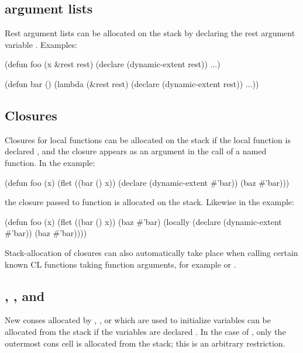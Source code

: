\subsection{ argument lists}

Rest argument lists can be allocated on the stack by declaring the
rest argument variable .  Examples:

\begin{lisp}
(defun foo (x &rest rest)
  (declare (dynamic-extent rest))
  ...)

(defun bar ()
  (lambda (&rest rest)
    (declare (dynamic-extent rest))
    ...))
\end{lisp}

\subsection{Closures}

Closures for local functions can be allocated on the stack if the
local function is declared , and the closure
appears as an argument in the call of a named function.  In the
example:

\begin{lisp}
(defun foo (x)
  (flet ((bar () x))
    (declare (dynamic-extent #'bar))
    (baz #'bar)))
\end{lisp}

the closure passed to function  is allocated on the stack.
Likewise in the example:

\begin{lisp}
(defun foo (x)
  (flet ((bar () x))
    (baz #'bar)
    (locally (declare (dynamic-extent #'bar))
      (baz #'bar))))
\end{lisp}


Stack-allocation of closures can also automatically take place when
calling certain known CL functions taking function arguments, for
example  or .

\subsection{, , and }

New conses allocated by , , or 
which are used to initialize variables can be allocated from the stack
if the variables are declared .  In the case of
, only the outermost cons cell is allocated from the stack;
this is an arbitrary restriction.

